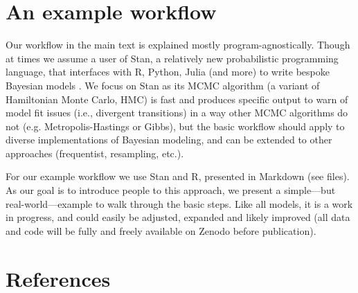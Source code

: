 \documentclass[11pt]{article}
\begin{document}
\section*{An example workflow}

Our workflow in the main text is explained mostly program-agnostically. Though at times we assume a user of \textsf{Stan}, a relatively new probabilistic programming language, that interfaces with \textsf{R, Python, Julia} (and more) to write bespoke Bayesian models \citep{Carpenter:2017stan}. We focus on \textsf{Stan} as its MCMC algorithm (a variant of Hamiltonian Monte Carlo, HMC) is fast and produces specific output to warn of model fit issues (i.e., divergent transitions) in a way other MCMC algorithms do not (e.g. Metropolis-Hastings or Gibbs), but the basic workflow should apply to diverse implementations of Bayesian modeling, and can be extended to other approaches (frequentist, resampling, etc.). 

For our example workflow we use \textsf{Stan} and \textsf{R}, presented in Markdown (see files). As our goal is to introduce people to this approach, we present a simple---but real-world---example to walk through the basic steps. Like all models, it is a work in progress, and could easily be adjusted, expanded and likely improved (all data and code will be fully and freely available on Zenodo before publication).

\section*{References}
\vspace{-5ex}

\end{document}
